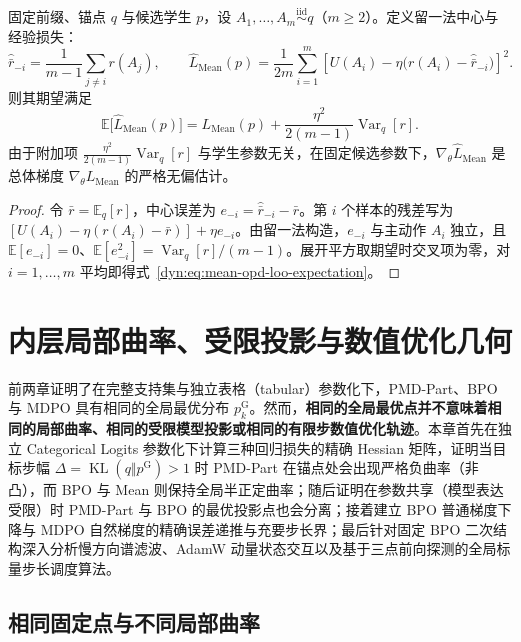\documentclass[lang=cn,scheme=chinese,openany]{elegantbook}
\newcommand{\E}{\mathbb E}
\newcommand{\KL}{\operatorname{KL}}
\newcommand{\Var}{\operatorname{Var}}
\begin{document}
\begin{proposition}
\label{dyn:prop:mean-opd-loo-expectation}
固定前缀、锚点 $q$ 与候选学生 $p$，设 $A_1,\ldots,A_m\overset{\mathrm{iid}}\sim q$（$m\ge2$）。定义留一法中心与经验损失：
\begin{equation*}
 \widehat{\bar r}_{-i}=\frac1{m-1}\sum_{j\ne i}r(A_j),
 \qquad
 \widehat L_{\mathrm{Mean}}(p)
 =\frac1{2m}\sum_{i=1}^m
 \left[U(A_i)-\eta\bigl(r(A_i)-\widehat{\bar r}_{-i}\bigr)\right]^2.
\end{equation*}
则其期望满足
\begin{equation}
 \E\bigl[\widehat L_{\mathrm{Mean}}(p)\bigr]
 =L_{\mathrm{Mean}}(p)
  +\frac{\eta^2}{2(m-1)}\Var_q[r].
 \label{dyn:eq:mean-opd-loo-expectation}
\end{equation}
由于附加项 $\frac{\eta^2}{2(m-1)}\Var_q[r]$ 与学生参数无关，在固定候选参数下，$\nabla_\theta\widehat L_{\mathrm{Mean}}$ 是总体梯度 $\nabla_\theta L_{\mathrm{Mean}}$ 的严格无偏估计。
\end{proposition}
\begin{proof}
令 $\bar r=\E_q[r]$，中心误差为 $e_{-i}=\widehat{\bar r}_{-i}-\bar r$。第 $i$ 个样本的残差写为 $[U(A_i)-\eta(r(A_i)-\bar r)]+\eta e_{-i}$。由留一法构造，$e_{-i}$ 与主动作 $A_i$ 独立，且 $\E[e_{-i}]=0$、$\E[e_{-i}^2]=\Var_q[r]/(m-1)$。展开平方取期望时交叉项为零，对 $i=1,\ldots,m$ 平均即得式~\eqref{dyn:eq:mean-opd-loo-expectation}。
\end{proof}

\chapter{内层局部曲率、受限投影与数值优化几何}
\label{ch:geometry}

前两章证明了在完整支持集与独立表格（tabular）参数化下，PMD-Part、BPO 与 MDPO 具有相同的全局最优分布 $p_k^{\mathrm G}$。然而，\textbf{相同的全局最优点并不意味着相同的局部曲率、相同的受限模型投影或相同的有限步数值优化轨迹}。本章首先在独立 Categorical Logits 参数化下计算三种回归损失的精确 Hessian 矩阵，证明当目标步幅 $\Delta=\KL(q\Vert p^{\mathrm G})>1$ 时 PMD-Part 在锚点处会出现严格负曲率（非凸），而 BPO 与 Mean 则保持全局半正定曲率；随后证明在参数共享（模型表达受限）时 PMD-Part 与 BPO 的最优投影点也会分离；接着建立 BPO 普通梯度下降与 MDPO 自然梯度的精确误差递推与充要步长界；最后针对固定 BPO 二次结构深入分析慢方向谱滤波、AdamW 动量状态交互以及基于三点前向探测的全局标量步长调度算法。

\section{相同固定点与不同局部曲率}
\label{sec:geometry-curvature}
\end{document}
